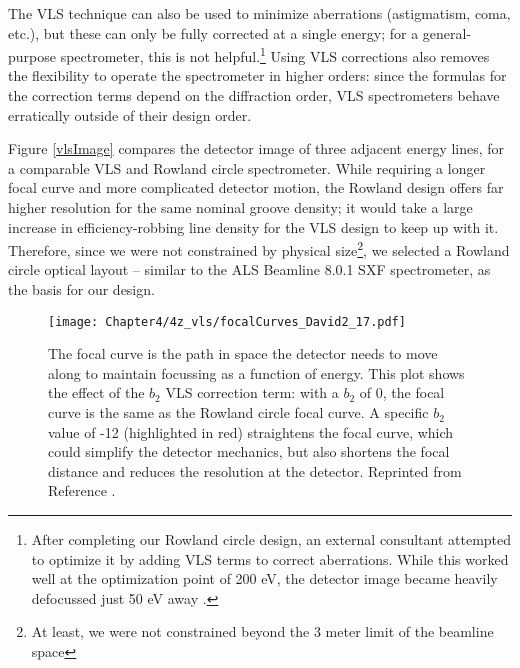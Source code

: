 The VLS technique can also be used to minimize aberrations (astigmatism, coma, etc.), but these can only be fully corrected at a single energy; for a general-purpose spectrometer, this is not helpful.\footnote{After completing our Rowland circle design, an external consultant attempted to optimize it by adding VLS terms to correct aberrations.  While this worked well at the optimization point of 200 eV, the detector image became heavily defocussed just 50 eV away \cite[Figure 5.1]{Mui06}.} Using VLS corrections also removes the flexibility to operate the spectrometer in higher orders: since the formulas for the correction terms depend on the diffraction order, VLS spectrometers behave erratically outside of their design order.

Figure \ref{vlsImage} compares the detector image of three adjacent energy lines, for a comparable VLS and Rowland circle spectrometer.  While requiring a longer focal curve and more complicated detector motion, the Rowland design offers far higher resolution for the same nominal groove density; it would take a large increase in efficiency-robbing line density for the VLS design to keep up with it.  Therefore, since we were not constrained by physical size\footnote{At least, we were not constrained beyond the 3 meter limit of the beamline space}, we selected a Rowland circle optical layout -- similar to the ALS Beamline 8.0.1 SXF spectrometer, as the basis for our design.

\begin{figure}[p] %
   \centering
   \texttt{[image: Chapter4/4z\_vls/focalCurves\_David2\_17.pdf]} 
   \caption[The focal curve is the path in space the detector needs to move along to maintain focussing as a function of energy.  This plot shows the effect of the $b_2$ VLS correction term.]{The focal curve is the path in space the detector needs to move along to maintain focussing as a function of energy.  This plot shows the effect of the $b_2$ VLS correction term: with a $b_2$ of 0, the focal curve is the same as the Rowland circle focal curve.  A specific $b_2$ value of -12 (highlighted in red) straightens the focal curve, which could simplify the detector mechanics, but also shortens the focal distance and reduces the resolution at the detector.  Reprinted from Reference \cite[Figure 2.17]{Mui06}.}
   \label{vlsCurves}
\end{figure}


